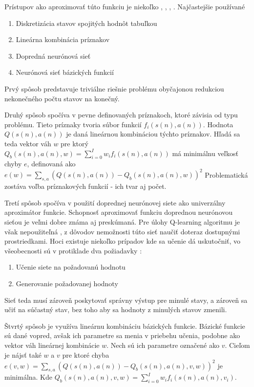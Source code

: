 Prístupov ako aproximovať túto funkciu je niekoľko \cite{bib:aproximation_01},
\cite{bib:aproximation_02}, \cite{bib:aproximation_03}, \cite{bib:aproximation_04}.
Najčastejšie používané
\begin{enumerate}
  \item Diskretizácia stavov spojitých hodnôt tabuľkou
  \item Lineárna kombinácia príznakov
  \item Dopredná neurónová sieť
  \item Neurónová sieť bázických funkcií
\end{enumerate}

Prvý spôsob predstavuje triviálne riešnie problému obyčajonou redukciou nekonečného
počtu stavov na konečný.

Druhý spôsob spočíva v pevne definovaných príznakoch, ktoré závisia od typu
problému. Tieto príznaky tvoria súbor funkcií $f_{i}(s(n),a(n))$. Hodnota $Q(s(n), a(n))$
je daná lineárnou kombináciou týchto príznakov. Hľadá sa teda vektor váh
$w$ pre ktorý  $Q_b(s(n), a(n), w) = \sum\limits_{i=0}^{I}w_i f_{i}(s(n),a(n))$
má minimálnu veľkosť chyby $e$, definovaná ako
$e(w) = \sum\limits_{s,a} (Q(s(n), a(n))- Q_b(s(n), a(n), w))^2$
Problematická zostáva voľba príznakových funkcií - ich tvar aj počet.

Tretí spôsob spočíva v použití doprednej neurónovej siete ako univerzálny aproximátor funkcie.
Schopnosť aproximovať funkciu doprednou neurónovou sieťou je veľmi dobre známa aj preskúmaná.
Pre úlohy Q-learning algoritmu je však nepoužiteľná \cite{bib:q_fnn_problem}
, z dôvodov nemožnosti túto sieť naučiť doteraz dostupnými prostriedkami. Hoci existuje niekoľko prípadov kde sa učenie dá
uskutočniť, vo všeobecnosti sú v protiklade dva požiadavky :
\begin{enumerate}
  \item Učenie siete na požadovanú hodnotu
  \item Generovanie požadovanej hodnoty
\end{enumerate}

Sieť teda musí zároveň poskytovať správny výstup pre minulé stavy, a zároveň sa
učiť na súčastný stav, bez toho aby sa hodnoty z minulých stavov zmenili.

Štvrtý spôsob je využíva lineárnu kombináciu bázických funkcie.
Bázické funkcie sú dané vopred, avšak ich parametre sa menia v priebehu učenia,
podobne ako vektor váh lineárnej kombinácie $w$. Nech sú ich parametre označené
ako $v$. Cieľom je nájsť také $w$ a $v$ pre ktoré chyba
$e(v, w) = \sum\limits_{s,a}(Q(s(n), a(n))- Q_b(s(n), a(n), v, w))^2$
je minimálna. Kde $Q_b(s(n), a(n), v, w) = \sum\limits_{i=0}^{I}w_i f_{i}(s(n),a(n), v_i)$.

